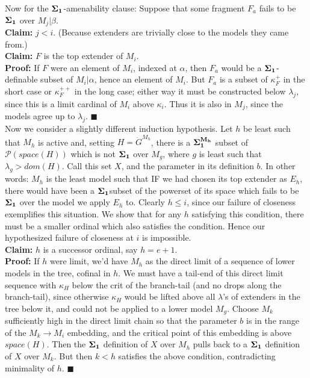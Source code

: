 \documentclass[12pt]{article}
\begin{document}
Now for the $\bf{\Sigma}_1$-amenability clause: Suppose that some fragment $F_a$ fails to be $\bf{\Sigma}_1$ over $M_j | \beta$.\\

{\bfseries Claim:} $j < i$. (Because extenders are trivially close to the models they came from.)\\

{\bfseries Claim:} $F$ is the top extender of $M_i$.\\

\indent \indent \textbf{Proof:} If $F$ were an element of $M_i$, indexed at $\alpha$, then $F_a$ would be a $\bf{\Sigma}_1$-definable subset of $M_i | \alpha$, hence an element of $M_i$.  But $F_a$ is a subset of $\kappa_F^+$ in the short case or $\kappa_F^{++}$ in the long case; either way it must be constructed below $\lambda_j$, since this is a limit cardinal of $M_i$ above $\kappa_i$.  Thus it is also in $M_j$, since the models agree up to $\lambda_j$. $\blacksquare$\\

Now we consider a slightly different induction hypothesis.  Let $h$ be least such that $M_h$ is active and, setting $H = \dot{G}^{M_h}$, there is a $\bf{\Sigma}_1^{M_h}$ subset of $\mathcal{P} ( space ( H ) )$ which is not $\bf{\Sigma}_1$ over $M_g$, where $g$ is least such that $\lambda_g > dom ( H )$.  Call this set $X$, and the parameter in its definition $b$.  In other words: $M_h$ is the least model such that IF we had chosen its top extender as $E_h$, there would have been a $\bf{\Sigma}_1$subset of the powerset of its space which fails to be $\bf{\Sigma}_1$ over the model we apply $E_h$ to.  Clearly $h \leq i$, since our failure of closeness exemplifies this situation.  We show that for any $h$ satisfying this condition, there must be a smaller ordinal which also satisfies the condition.  Hence our hypothesized failure of closeness at $i$ is impossible. \\


{\bfseries Claim:} $h$ is a successor ordinal, say $h = e+1$.\\

\indent \indent \textbf{Proof:} If $h$ were limit, we'd have $M_h$ as the direct limit of a sequence of lower models in the tree, cofinal in $h$.  We must have a tail-end of this direct limit sequence with $\kappa_H$ below the crit of the branch-tail (and no drops along the branch-tail), since otherwise $\kappa_H$ would be lifted above all $\lambda$'s of extenders in the tree below it, and could not be applied to a lower model $M_g$.  Choose $M_k$ sufficiently high in the direct limit chain so that the parameter $b$ is in the range of the $M_k \longrightarrow M_i$ embedding, and the critical point of this embedding is above $space (H)$.  Then the $\bf{\Sigma}_1$ definition of $X$ over $M_h$ pulls back to a $\bf{\Sigma}_1$ definition of $X$ over $M_k$.  But then $k < h$ satisfies the above condition, contradicting minimality of $h$.  $\blacksquare$\\
\end{document}
